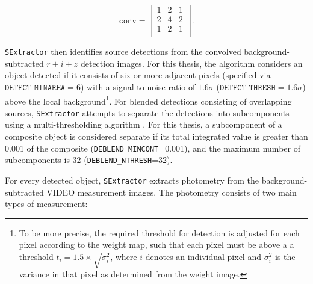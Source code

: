 \begin{equation}
\texttt{conv} =
 \begin{bmatrix}
 1 & 2 & 1 \\
 2 & 4 & 2 \\
 1 & 2 & 1 \\
 \end{bmatrix}.
\end{equation}



\texttt{SExtractor} then identifies source detections from the convolved background-subtracted $r+i+z$ detection images. For this thesis, the algorithm considers an object detected if it consists of six or more adjacent pixels (specified via $\texttt{DETECT\_MINAREA} = 6$) with a signal-to-noise ratio of  $1.6\sigma$ ($\texttt{DETECT\_THRESH} = 1.6\sigma$) above the local background\footnote{To be more precise, the required threshold for detection is adjusted for each pixel according to the weight map, such that each pixel must be above a a threshold $t_{i}=1.5\times\sqrt{\sigma_{i}^2}$, where $i$ denotes an individual pixel and $\sigma_{i}^2$ is the variance in that pixel as determined from the weight image.}. For blended detections consisting of overlapping sources, \texttt{SExtractor} attempts to separate the detections into subcomponents using a multi-thresholding algorithm \citep{1996A&AS..117..393B}. For this thesis, a subcomponent of a composite object is considered separate if its total integrated value is greater than 0.001 of the composite (\texttt{DEBLEND\_MINCONT}=0.001), and the maximum number of subcomponents is 32 (\texttt{DEBLEND\_NTHRESH}=32). \par




For every detected object, \texttt{SExtractor} extracts photometry from the back\-ground-subtracted VIDEO measurement images. The photometry consists of two main types of measurement: 


